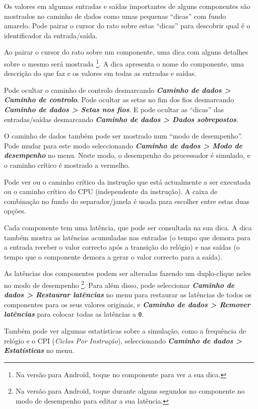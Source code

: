 \documentclass[11pt,a4paper,twoside,titlepage]{article}
\newcommand{\menupath}[1]{\textbf{\emph{#1}}}
\begin{document}
Os valores em algumas entradas e saídas importantes de alguns componentes são
mostrados no caminho de dados como umas pequenas ``dicas'' com 
fundo amarelo.
Pode pairar o cursor do rato sobre estas ``dicas'' para descobrir qual é o
identificador da entrada/saída.

Ao pairar o cursor do rato sobre um componente, uma dica com alguns detalhes
sobre o mesmo será mostrada \footnote{Na versão para Android, toque no
componente para ver a sua dica.}.
A dica apresenta o nome do componente, uma descrição do que faz e os valores
em todas as entradas e saídas.

Pode ocultar o caminho de controlo desmarcando
\menupath{Caminho de dados > Caminho de controlo}.
Pode ocultar as setas no fim dos fios desmarcando
\menupath{Caminho de dados > Setas nos fios}.
E pode ocultar as ``dicas'' das entradas/saídas desmarcando
\menupath{Caminho de dados > Dados sobrepostos}.

\bigskip

O caminho de dados também pode ser mostrado num ``modo de desempenho''.
Pode mudar para este modo seleccionando 
\menupath{Caminho de dados > Modo de desempenho} no menu.
Neste modo, o desempenho do processador é simulado, e o caminho crítico
é mostrado a vermelho.

Pode ver ou o caminho crítico da instrução que está actualmente a ser
executada ou o caminho crítico do CPU (independente da instrução).
A caixa de combinação no fundo do separador/janela é usada para escolher
entre estas duas opções.

Cada componente tem uma latência, que pode ser consultada na sua dica.
A dica também mostra as latências acumuladas nas entradas (o tempo que
demora para a entrada receber o valor correcto após a transição do relógio)
e nas saídas (o tempo que o componente demora a gerar o valor correcto para
a saída).

As latências dos componentes podem ser alteradas fazendo um duplo-clique
neles no modo de desempenho \footnote{Na versão para Android, toque durante
alguns segundos no componente no modo de desempenho para editar a sua
latência.}.
Para além disso, pode seleccionar 
\menupath{Caminho de dados > Restaurar latências} no menu para restaurar as
latências de todos os componentes para os seus valores originais, e
\menupath{Caminho de dados > Remover latências} para colocar todas as
latências a \verb+0+.

Também pode ver algumas estatísticas sobre a simulação, como a frequência de
relógio e o CPI (\emph{Ciclos Por Instrução}), seleccionando
\menupath{Caminho de dados > Estatísticas} no menu.
\end{document}
